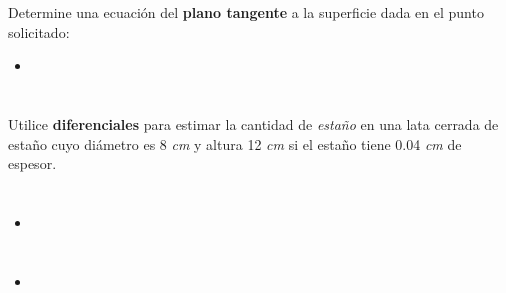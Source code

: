 \documentclass[12pt]{article}
\begin{document}
\section{}

Determine una ecuación del \textbf{plano tangente} a la superficie dada en el punto solicitado:

\begin{itemize}[format=\textbf]

\item

\end{itemize}

\section{}

\section{}

Utilice \textbf{diferenciales} para estimar la cantidad de \textit{estaño} en una lata cerrada de estaño cuyo diámetro es 8 \textit{cm} y altura 12 \textit{cm} si el estaño tiene
0.04 \textit{cm} de espesor.

\section{}

\begin{itemize}[format=\textbf]

\item

\end{itemize}

\section{}

\section{}

\section{}

\begin{itemize}[format=\textbf]

\item

\end{itemize}
\end{document}
